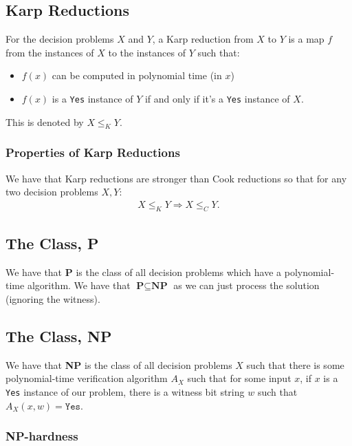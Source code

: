 \subsection{Karp Reductions}

For the decision problems $X$ and $Y$, a Karp reduction from $X$ to $Y$
is a map $f$ from the instances of $X$ to the instances of $Y$ such that:
\begin{itemize}
  \item $f(x)$ can be computed in polynomial time (in $x$)
  \item $f(x)$ is a \texttt{Yes} instance of $Y$ if and only if it's a \texttt{Yes} instance
  of $X$.
\end{itemize} This is denoted by $X \leq_K Y$.

\subsubsection{Properties of Karp Reductions}

We have that Karp reductions are stronger than Cook reductions so that for any two
decision problems $X, Y$: \begin{gather*}
    X \leq_K Y \Rightarrow X \leq_C Y.
\end{gather*}

\subsection{The Class, \textbf{P}}

We have that \textbf{P} is the class of all decision problems which have a polynomial-time
algorithm. We have that $\textbf{P} \subseteq \textbf{NP}$ as we can just process the solution
(ignoring the witness).

\subsection{The Class, \textbf{NP}}

We have that \textbf{NP} is the class of all decision problems $X$ such that there is some
polynomial-time verification algorithm $A_X$ such that for some input $x$, 
if $x$ is a \texttt{Yes} instance of our problem, there is a witness bit string $w$
such that $A_X(x, w) = \texttt{Yes}$.

\subsubsection{\textbf{NP}-hardness}


